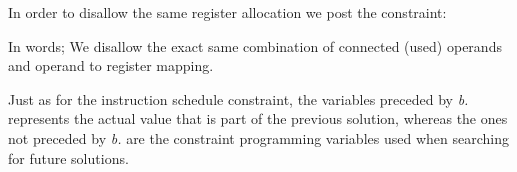 \vspace{0.2cm}

In order to disallow the same register allocation we post the constraint:

\vspace{0.2cm}
\noindent{}
\vspace{0.2cm}

In words; We disallow the exact same combination of connected (used) operands and
operand to register mapping.

Just as for the instruction schedule constraint, the variables preceded by \textit{b.}
represents the actual value that is part of the previous solution, whereas the ones not
preceded by \textit{b.} are the constraint programming variables used when searching for
future solutions.

